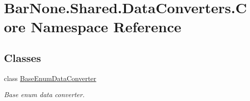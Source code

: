 \hypertarget{namespace_bar_none_1_1_shared_1_1_data_converters_1_1_core}{}\section{Bar\+None.\+Shared.\+Data\+Converters.\+Core Namespace Reference}
\label{namespace_bar_none_1_1_shared_1_1_data_converters_1_1_core}
\subsection*{Classes}
\begin{DoxyCompactItemize}
\item 
class \mbox{\hyperlink{class_bar_none_1_1_shared_1_1_data_converters_1_1_core_1_1_base_enum_data_converter}{Base\+Enum\+Data\+Converter}}
\begin{DoxyCompactList}\small\item\em Base enum data converter. \end{DoxyCompactList}\end{DoxyCompactItemize}
